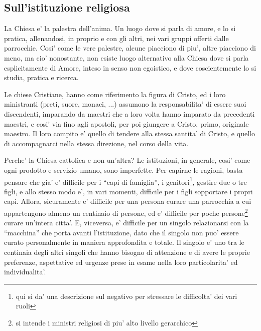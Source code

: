 \subsection{Sull'istituzione religiosa}
La Chiesa e' la palestra dell'anima. Un luogo dove si parla di amore, e lo si pratica, allenandosi, in proprio e con gli altri, nei vari gruppi offerti dalle parrocchie. Cosi' come le vere palestre, alcune piacciono di piu', altre piacciono di meno, ma cio' nonostante, non esiste luogo alternativo alla Chiesa dove si parla esplicitamente di Amore, inteso in senso non egoistico, e dove coscientemente lo si studia, pratica e ricerca. 

Le chiese Cristiane, hanno come riferimento la figura di Cristo, ed i loro ministranti (preti, suore, monaci, ...) assumono la responsabilita' di essere suoi discendenti, imparando da maestri che a loro volta hanno imparato da precedenti maestri, e cosi' via fino agli apostoli, per poi giungere a Cristo, primo, originale maestro. Il loro compito e' quello di tendere alla stessa santita' di Cristo, e quello di accompagnarci nella stessa direzione, nel corso della vita.

Perche' la Chiesa cattolica e non un'altra? Le istituzioni, in generale, cosi' come ogni prodotto e servizio umano, sono imperfette. Per capirne le ragioni, basta pensare che gia' e' difficile per i ``capi di famiglia'', i genitori\footnote{qui si da' una descrizione sul negativo per stressare le difficolta' dei vari ruoli}, gestire due o tre figli, e allo stesso modo e', in vari momenti, difficile per i figli sopportare i propri capi. 
Allora, sicuramente e' difficile per una persona curare una parrocchia a cui appartengono almeno un centinaio di persone, ed e' difficile per poche persone\footnote{si intende i ministri religiosi di piu' alto livello gerarchico} curare un'intera citta'. E, viceversa, e' difficile per un singolo relazionarsi con la ``macchina'' che porta avanti l'istituzione, dato che il singolo non puo' essere curato personalmente in maniera approfondita e totale. Il singolo e' uno tra le centinaia degli altri singoli che hanno bisogno di attenzione e di avere le proprie preferenze, aspettative ed urgenze prese in esame nella loro particolarita' ed individualita'.

